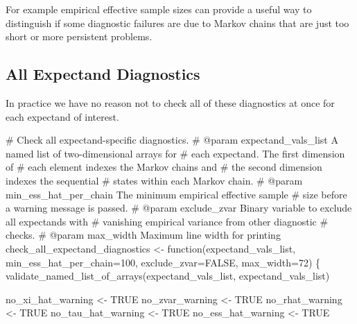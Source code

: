\documentclass[
  letterpaper,
  DIV=11,
  numbers=noendperiod]{scrartcl}
\newenvironment{Shaded}{\begin{snugshade}}{\end{snugshade}}
\newcommand{\CommentTok}[1]{\textcolor[rgb]{0.37,0.37,0.37}{#1}}
\newcommand{\DecValTok}[1]{\textcolor[rgb]{0.68,0.00,0.00}{#1}}
\newcommand{\NormalTok}[1]{\textcolor[rgb]{0.00,0.23,0.31}{#1}}
\newcommand{\OperatorTok}[1]{\textcolor[rgb]{0.37,0.37,0.37}{#1}}
\newcommand{\StringTok}[1]{\textcolor[rgb]{0.13,0.47,0.30}{#1}}
\begin{document}
For example empirical effective sample sizes can provide a useful way to
distinguish if some diagnostic failures are due to Markov chains that
are just too short or more persistent problems.

\subsection{All Expectand Diagnostics}\label{all-expectand-diagnostics}

In practice we have no reason not to check all of these diagnostics at
once for each expectand of interest.

\begin{Shaded}
\begin{Highlighting}[]
\CommentTok{\# Check all expectand{-}specific diagnostics.}
\CommentTok{\# @param expectand\_vals\_list A named list of two{-}dimensional arrays for}
\CommentTok{\#                            each expectand.  The first dimension of}
\CommentTok{\#                            each element indexes the Markov chains and}
\CommentTok{\#                            the second dimension indexes the sequential}
\CommentTok{\#                            states within each Markov chain.}
\CommentTok{\# @param min\_ess\_hat\_per\_chain The minimum empirical effective sample}
\CommentTok{\#                              size before a warning message is passed.}
\CommentTok{\# @param exclude\_zvar Binary variable to exclude all expectands with}
\CommentTok{\#                     vanishing empirical variance from other diagnostic}
\CommentTok{\#                     checks.}
\CommentTok{\# @param max\_width Maximum line width for printing}
\NormalTok{check\_all\_expectand\_diagnostics }\OperatorTok{\textless{}{-}}\NormalTok{ function(expectand\_vals\_list,}
\NormalTok{                                            min\_ess\_hat\_per\_chain}\OperatorTok{=}\DecValTok{100}\NormalTok{,}
\NormalTok{                                            exclude\_zvar}\OperatorTok{=}\NormalTok{FALSE,}
\NormalTok{                                            max\_width}\OperatorTok{=}\DecValTok{72}\NormalTok{) \{}
\NormalTok{  validate\_named\_list\_of\_arrays(expectand\_vals\_list,}
                                \StringTok{\textquotesingle{}expectand\_vals\_list\textquotesingle{}}\NormalTok{)}
  
\NormalTok{  no\_xi\_hat\_warning }\OperatorTok{\textless{}{-}}\NormalTok{ TRUE}
\NormalTok{  no\_zvar\_warning }\OperatorTok{\textless{}{-}}\NormalTok{ TRUE}
\NormalTok{  no\_rhat\_warning }\OperatorTok{\textless{}{-}}\NormalTok{ TRUE}
\NormalTok{  no\_tau\_hat\_warning }\OperatorTok{\textless{}{-}}\NormalTok{ TRUE}
\NormalTok{  no\_ess\_hat\_warning }\OperatorTok{\textless{}{-}}\NormalTok{ TRUE}


\end{Highlighting}
\end{Shaded}
\end{document}

